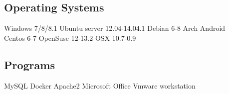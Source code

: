 \documentclass[letterpaper]{deedy-resume} %
\begin{document}
\begin{minipage}[t]{0.31\textwidth}
\sectionspace %

\subsection{Operating Systems}
Windows 7/8/8.1 \textbullet{} Ubuntu server 12.04-14.04.1 \textbullet{} Debian 6-8 \textbullet{} Arch  \textbullet{} Android \\
\textbullet{}Centos 6-7   \textbullet{} OpenSuse 12-13.2 \textbullet{}   OSX 10.7-0.9 
\sectionspace %
\subsection{Programs}

MySQL \textbullet{} Docker \textbullet{}   \textbullet{} Apache2 \textbullet{} Microsoft Office \textbullet{} Vmware workstation 
\sectionspace %

\end{minipage} %
\hfill
\begin{minipage}[t]{0.4\textwidth}
\end{minipage}
%
%
\end{document}
